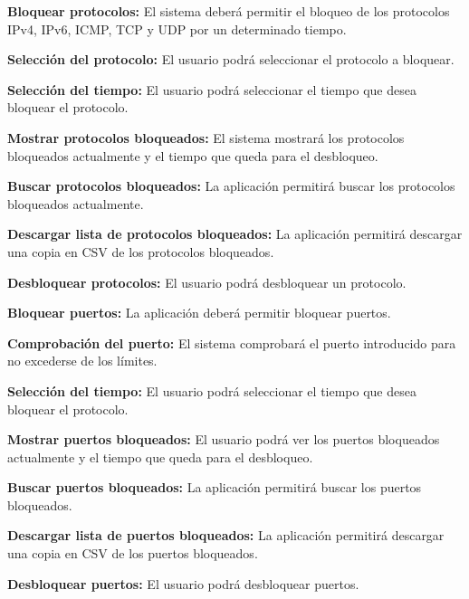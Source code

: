 \begin{functional}
        \setcounter{enumi}{9}
        \item \textbf{Bloquear protocolos:} El sistema deberá permitir el bloqueo de los protocolos IPv4, IPv6, ICMP, TCP y UDP por un determinado tiempo.
        \begin{functional}
        \item \textbf{Selección del protocolo:} El usuario podrá seleccionar el protocolo a bloquear.
        \item \textbf{Selección del tiempo:} El usuario podrá seleccionar el tiempo que desea bloquear el protocolo.
        \item \textbf{Mostrar protocolos bloqueados:} El sistema mostrará los protocolos bloqueados actualmente y el tiempo que queda para el desbloqueo.
        \item \textbf{Buscar protocolos bloqueados:} La aplicación permitirá buscar los protocolos bloqueados actualmente.
        \item \textbf{Descargar lista de protocolos bloqueados:} La aplicación permitirá descargar una copia en CSV de los protocolos bloqueados.
        \item \textbf{Desbloquear protocolos:} El usuario podrá desbloquear un protocolo.
        \end{functional}

        \item \textbf{Bloquear puertos:} La aplicación deberá permitir bloquear puertos.
        \begin{functional}
        \item \textbf{Comprobación del puerto:} El sistema comprobará el puerto introducido para no excederse de los límites.
        \item \textbf{Selección del tiempo:} El usuario podrá seleccionar el tiempo que desea bloquear el protocolo.
        \item \textbf{Mostrar puertos bloqueados:} El usuario podrá ver los puertos bloqueados actualmente y el tiempo que queda para el desbloqueo.
        \item \textbf{Buscar puertos bloqueados:} La aplicación permitirá buscar los puertos bloqueados.
        \item \textbf{Descargar lista de puertos bloqueados:} La aplicación permitirá descargar una copia en CSV de los puertos bloqueados.
        \item \textbf{Desbloquear puertos:} El usuario podrá desbloquear puertos.
        \end{functional}


\end{functional}
